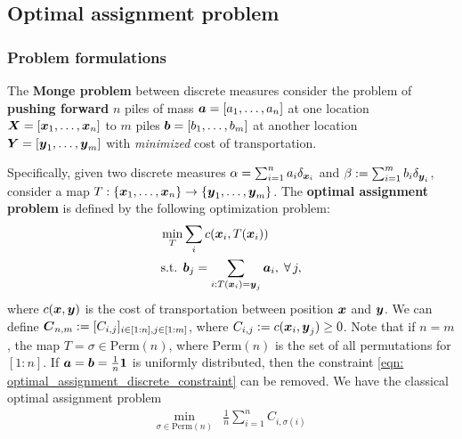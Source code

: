 \documentclass[11pt]{article}
\begin{document}
\subsection{Optimal assignment problem}
\subsubsection{Problem formulations}
The \textbf{Monge problem} between discrete measures consider the problem of  \textbf{pushing forward} $n$ piles of mass $\boldsymbol{a}=[a_1, \ldots, a_n]$ at one location $\boldsymbol{X} = [\boldsymbol{x}_1, \ldots, \boldsymbol{x}_{n}]$  to $m$ piles $\boldsymbol{b}=[b_1, \ldots, b_m]$ at another location  $\boldsymbol{Y} = [\boldsymbol{y}_1, \ldots, \boldsymbol{y}_{m}]$ with \emph{minimized} cost of transportation.

Specifically, given two discrete measures $\alpha = \sum_{i=1}^{n}a_i \delta_{\boldsymbol{x}_{i}}$ and $\beta := \sum_{i=1}^{m}b_i \delta_{\boldsymbol{y}_{i}}$, consider a map $T: \{\boldsymbol{x}_1, \ldots, \boldsymbol{x}_{n}\} \rightarrow \{\boldsymbol{y}_1, \ldots, \boldsymbol{y}_{m}\}$.  The \textbf{optimal assignment problem} is defined by the following optimization problem: 
\begin{align}
\min_{T}& \sum_{i}c(\boldsymbol{x}_i, T(\boldsymbol{x}_i)) \label{eqn: optimal_assignment_discrete}\\
\text{s.t. }& \boldsymbol{b}_{j} = \sum_{i: T(\boldsymbol{x}_i) = \boldsymbol{y}_{j}}\boldsymbol{a}_{i},\; \forall\, j,  \label{eqn: optimal_assignment_discrete_constraint}
\end{align}where $c(\boldsymbol{x}, \boldsymbol{y})$ is the cost of transportation between position $\boldsymbol{x}$ and $\boldsymbol{y}$. We can define  $\boldsymbol{C}_{n,m} := [C_{i,j}]_{i\in [1:n], j\in [1:m]}$, where $C_{i,j}:= c(\boldsymbol{x}_i, \boldsymbol{y}_j) \ge 0$. Note that if $n=m$, the map $T=\sigma \in \text{Perm}(n)$, where $\text{Perm}(n)$ is the set of all permutations for $[1:n]$. If $\boldsymbol{a} = \boldsymbol{b} = \frac{1}{n}\boldsymbol{1}$ is uniformly distributed, then the constraint \eqref{eqn: optimal_assignment_discrete_constraint} can be removed. We have the classical optimal assignment problem \citep{gabriel2019computational}
\begin{align}
\min_{\sigma \in \text{Perm}(n)}& \frac{1}{n}\sum_{i=1}^{n} C_{i, \sigma(i)} \label{eqn: classical_optimal_assignment}
\end{align} 
\end{document}
